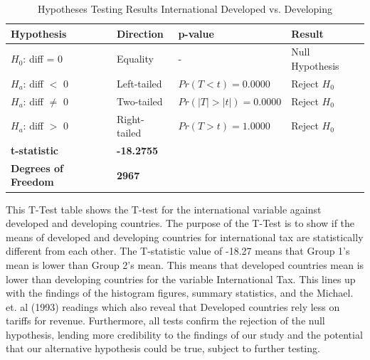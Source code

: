 \documentclass[12pt]{article}
\begin{document}
\begin{table}[H]
\centering
\caption{Hypotheses Testing Results International Developed vs. Developing}
\label{tab:hypothesis_test}
\renewcommand{\arraystretch}{1.2} %
\begin{tabular}{|l|l|l|l|}
\hline
\textbf{Hypothesis}          & \textbf{Direction} & \textbf{p-value}      & \textbf{Result}       \\ \hline
$H_0$: diff = 0              & Equality           & -                     & Null Hypothesis       \\ \hline
$H_a$: diff $<$ 0            & Left-tailed        & $Pr(T < t) = 0.0000$  & Reject $H_0$          \\ \hline
$H_a$: diff $\neq$ 0         & Two-tailed         & $Pr(|T| > |t|) = 0.0000$ & Reject $H_0$       \\ \hline
$H_a$: diff $>$ 0            & Right-tailed       & $Pr(T > t) = 1.0000$  & Reject $H_0$          \\ \hline
\textbf{t-statistic}         & \textbf{-18.2755}  &                       &                       \\ \hline
\textbf{Degrees of Freedom}  & \textbf{2967}      &                       &                       \\ \hline
\end{tabular}
\end{table}

This T-Test table shows the T-test for the international variable against developed and developing countries. The purpose of the T-Test is to show if the means of developed and developing countries for international tax are statistically different from each other. The T-statistic value of -18.27 means that Group 1's mean is lower than Group 2's mean. This means that developed countries mean is lower than developing countries for the variable International Tax. This lines up with the findings of the histogram figures, summary statistics, and the  Michael. et. al (1993) readings which also reveal that Developed countries rely less on tariffs for revenue. Furthermore, all tests confirm the rejection of the null hypothesis, lending more credibility to the findings of our study and the potential that our alternative hypothesis could be true, subject to further testing. 
\end{document}
